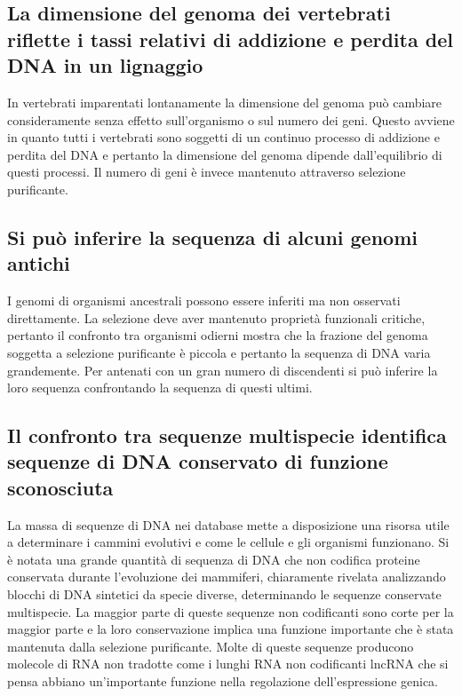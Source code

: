 \subsection{La dimensione del genoma dei vertebrati riflette i tassi relativi di addizione e perdita del DNA in un lignaggio}
In vertebrati imparentati lontanamente la dimensione del genoma pu\`o cambiare consideramente senza effetto sull'organismo o sul numero dei geni. Questo avviene in quanto tutti i 
vertebrati sono soggetti di un continuo processo di addizione e perdita del DNA e pertanto la dimensione del genoma dipende dall'equilibrio di questi processi. Il numero di geni \`e 
invece mantenuto attraverso selezione purificante.
\subsection{Si pu\`o inferire la sequenza di alcuni genomi antichi}
I genomi di organismi ancestrali possono essere inferiti ma non osservati direttamente. La selezione deve aver mantenuto propriet\`a funzionali critiche, pertanto il confronto tra 
organismi odierni mostra che la frazione del genoma soggetta a selezione purificante \`e piccola e pertanto la sequenza di DNA varia grandemente. Per antenati con un gran numero di 
discendenti si pu\`o inferire la loro sequenza confrontando la sequenza di questi ultimi. 
\subsection{Il confronto tra sequenze multispecie identifica sequenze di DNA conservato di funzione sconosciuta}
La massa di sequenze di DNA nei database mette a disposizione una risorsa utile a determinare i cammini evolutivi e come le cellule e gli organismi funzionano. Si \`e notata una grande
quantit\`a di sequenza di DNA che non codifica proteine conservata durante l'evoluzione dei mammiferi, chiaramente rivelata analizzando blocchi di DNA sintetici da specie diverse, 
determinando le sequenze conservate multispecie. La maggior parte di queste sequenze non codificanti sono corte per la maggior parte e la loro conservazione implica una funzione 
importante che \`e stata mantenuta dalla selezione purificante. Molte di queste sequenze producono molecole di RNA non tradotte come i lunghi RNA non codificanti lncRNA che si pensa
abbiano un'importante funzione nella regolazione dell'espressione genica. 
